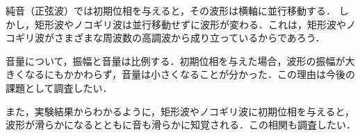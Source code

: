 \consideration
純音（正弦波）では初期位相を与えると，その波形は横軸に並行移動する．
しかし，矩形波やノコギリ波は並行移動せずに波形が変わる．これは，矩形波やノコギリ波がさまざまな周波数の高調波から成り立っているからであろう．\par
音量について，振幅と音量は比例する．初期位相を与えた場合，波形の振幅が大きくなるにもかかわらず，音量は小さくなることが分かった．この理由は今後の課題として調査したい．\par
また，実験結果からわかるように，矩形波やノコギリ波に初期位相を与えると，波形が滑らかになるとともに音も滑らかに知覚される．この相関も調査したい．
\section{\kadaicb}\label{sec:\kadaicb}